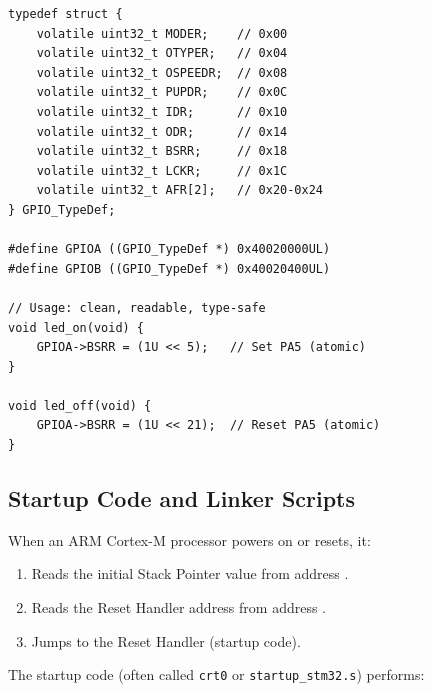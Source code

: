 \begin{lstlisting}[style=C, caption={Struct overlay technique for register access.}]
typedef struct {
    volatile uint32_t MODER;    // 0x00
    volatile uint32_t OTYPER;   // 0x04
    volatile uint32_t OSPEEDR;  // 0x08
    volatile uint32_t PUPDR;    // 0x0C
    volatile uint32_t IDR;      // 0x10
    volatile uint32_t ODR;      // 0x14
    volatile uint32_t BSRR;     // 0x18
    volatile uint32_t LCKR;     // 0x1C
    volatile uint32_t AFR[2];   // 0x20-0x24
} GPIO_TypeDef;

#define GPIOA ((GPIO_TypeDef *) 0x40020000UL)
#define GPIOB ((GPIO_TypeDef *) 0x40020400UL)

// Usage: clean, readable, type-safe
void led_on(void) {
    GPIOA->BSRR = (1U << 5);   // Set PA5 (atomic)
}

void led_off(void) {
    GPIOA->BSRR = (1U << 21);  // Reset PA5 (atomic)
}
\end{lstlisting}

\subsection{Startup Code and Linker Scripts}

When an ARM Cortex-M processor powers on or resets, it:
\begin{enumerate}
  \item Reads the initial Stack Pointer value from address .
  \item Reads the Reset Handler address from address .
  \item Jumps to the Reset Handler (startup code).
\end{enumerate}

The startup code (often called \texttt{crt0} or \texttt{startup\_stm32.s}) performs:

